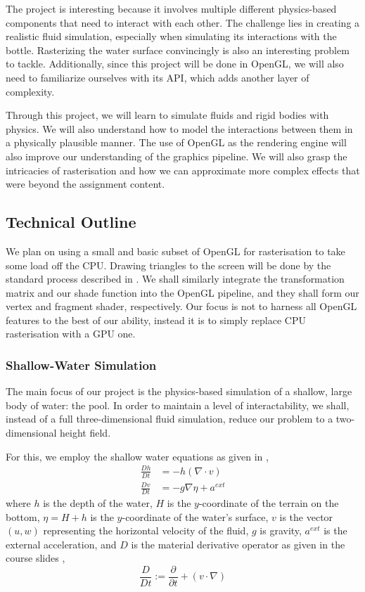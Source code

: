 The project is interesting because it involves multiple different physics-based components that need to interact with each other. The challenge lies in creating a realistic fluid simulation, especially when simulating its interactions with the bottle. Rasterizing the water surface convincingly is also an interesting problem to tackle. Additionally, since this project will be done in OpenGL, we will also need to familiarize ourselves with its API, which adds another layer of complexity.

Through this project, we will learn to simulate fluids and rigid bodies with physics. We will also understand how to model the interactions between them in a physically plausible manner. The use of OpenGL as the rendering engine will also improve our understanding of the graphics pipeline. We will also grasp the intricacies of rasterisation and how we can approximate more complex effects that were beyond the assignment content.

\subsection{Technical Outline}

We plan on using a small and basic subset of OpenGL for rasterisation to take some load off the CPU. 
Drawing triangles to the screen will be done by the standard process described in \cite{LearnOpenGL:Ch5}.
We shall similarly integrate the transformation matrix and our shade function into the OpenGL pipeline, and they shall form our vertex and fragment shader, respectively.
Our focus is not to harness all OpenGL features to the best of our ability, instead it is to simply replace CPU rasterisation with a GPU one.
\subsubsection{Shallow-Water Simulation}
The main focus of our project is the physics-based simulation of a shallow, large body of water: the pool.
In order to maintain a level of interactability, we shall, instead of a full three-dimensional fluid simulation, reduce our problem to a two-dimensional height field.

For this, we employ the shallow water equations as given in \cite{hfluid},
\begin{align*}
    \frac{Dh}{Dt} &= -h (\nabla \cdot v) \\
    \frac{Dv}{Dt} &= -g\nabla \eta + a^{ext}
\end{align*}
where $h$ is the depth of the water, $H$ is the $y$-coordinate of the terrain on the bottom, $\eta = H+h$ is the $y$-coordinate of the water's surface, $v$ is the vector $(u,w)$ representing the horizontal velocity of the fluid, $g$ is gravity, $a^{ext}$ is the external acceleration, and $D$ is the material derivative operator as given in the course slides \cite{lec:waves}, $$\frac D{Dt} := \frac\partial{\partial t} + (v \cdot \nabla)$$

